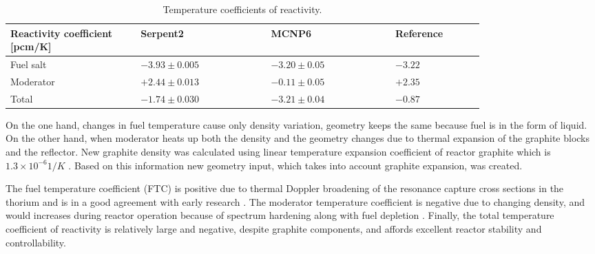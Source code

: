\documentclass{anstrans}
\begin{document}
\captionsetup[table]{
  labelsep = newline,
  name = TABLE, 
  justification=justified,
  singlelinecheck=false,%
  labelsep=colon,%
  skip = \medskipamount}
\begin{table}[h!]
\begin{tabular}{p{0.22\linewidth} p{0.22\linewidth} p{0.21\linewidth} p{0.15\linewidth}} \toprule
   Reactivity coefficient [pcm/K]  & Serpent2      & MCNP6 \cite{park_whole_2015}   & Reference \cite{robertson_conceptual_1971}      
\\ \midrule
Fuel salt        & $-3.93\pm0.005$ & $-3.20\pm0.05$ & $-3.22$ 
\\ \midrule
Moderator        & $+2.44\pm0.013$ & $-0.11\pm0.05$ & $+2.35$ 
\\ \midrule
Total            & $-1.74\pm0.030$ & $-3.21\pm0.04$ & $-0.87$ 
\\
\bottomrule
\end{tabular}
  \caption{Temperature coefficients of reactivity.}
  \label{tab:tcoef}
\end{table}
On the one hand, changes in fuel temperature cause only density variation, geometry keeps the same because fuel is in the form of liquid. On the other hand, when moderator heats up both the density and the geometry changes due to thermal expansion of the graphite blocks and the reflector. New graphite density was calculated using linear temperature expansion coefficient of reactor graphite which is $1.3\times10^{-6}1/K$ \cite{robertson_conceptual_1971}. Based on this information new geometry input, which takes into account graphite expansion, was created.

The fuel temperature coefficient (FTC) is positive due to thermal Doppler broadening of the resonance capture cross sections in the thorium and is in a good agreement with early research \cite{robertson_conceptual_1971,park_whole_2015}. The moderator temperature coefficient is negative due to changing density, and would increases during reactor operation because of spectrum hardening along with fuel depletion \cite{park_whole_2015}. Finally, the total temperature coefficient of reactivity is relatively large and negative, despite graphite components, and affords excellent reactor stability and controllability.
\end{document}
